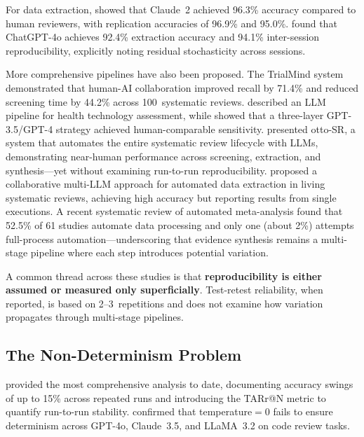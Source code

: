 \documentclass[preprint,review,12pt,authoryear]{elsarticle}
\begin{document}
For data extraction, \citet{gartlehner2024extraction} showed that Claude~2 achieved 96.3\% accuracy compared to human reviewers, with replication accuracies of 96.9\% and 95.0\%.
\citet{jensen2025chatgpt} found that ChatGPT-4o achieves 92.4\% extraction accuracy and 94.1\% inter-session reproducibility, explicitly noting residual stochasticity across sessions.

More comprehensive pipelines have also been proposed.
The TrialMind system \citep{wang2025trialmind} demonstrated that human-AI collaboration improved recall by 71.4\% and reduced screening time by 44.2\% across 100~systematic reviews.
\citet{li2025jamia} described an LLM pipeline for health technology assessment, while \citet{matsui2024screening} showed that a three-layer GPT-3.5/GPT-4 strategy achieved human-comparable sensitivity.
\citet{cao2025ottosr} presented otto-SR, a system that automates the entire systematic review lifecycle with LLMs, demonstrating near-human performance across screening, extraction, and synthesis---yet without examining run-to-run reproducibility.
\citet{khan2025collaborative} proposed a collaborative multi-LLM approach for automated data extraction in living systematic reviews, achieving high accuracy but reporting results from single executions.
A recent systematic review of automated meta-analysis \citep{li2025transforming} found that 52.5\% of 61 studies automate data processing and only one (about 2\%) attempts full-process automation---underscoring that evidence synthesis remains a multi-stage pipeline where each step introduces potential variation.

A common thread across these studies is that \textbf{reproducibility is either assumed or measured only superficially}.
Test-retest reliability, when reported, is based on 2--3~repetitions and does not examine how variation propagates through multi-stage pipelines.

\subsection{The Non-Determinism Problem}

\citet{atil2024nondeterminism} provided the most comprehensive analysis to date, documenting accuracy swings of up to 15\% across repeated runs and introducing the TARr@N metric to quantify run-to-run stability.
\citet{klishevich2025codereview} confirmed that temperature${=}$0 fails to ensure determinism across GPT-4o, Claude~3.5, and LLaMA~3.2 on code review tasks.
\end{document}
